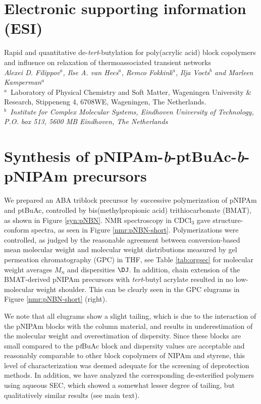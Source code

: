 \documentclass{article}
\begin{document}
\section*{Electronic supporting information (ESI)}
{\Large{Rapid and quantitative de-\emph{tert}-butylation for poly(acrylic acid) block copolymers and
influence on relaxation of thermoassociated transient networks}}\\[3\baselineskip]
{\textit{Alexei D. Filippov$^a$, Ilse A. van Hees$^a$, Remco Fokkink$^a$, Ilja Voets$^b$ and Marleen Kamperman$^a$}}\\[1\baselineskip]
{\textit{$^{a}$}~Laboratory of Physical Chemistry and Soft Matter, Wageningen University \&
Research, Stippeneng 4, 6708WE, Wageningen, The Netherlands.} \\
{\textit{$^{b}$~Institute for Complex Molecular Systems, Eindhoven University of Technology,
P.O. box 513, 5600 MB Eindhoven, The Netherlands}}

\clearpage
\section{Synthesis of pNIPAm-\emph{b}-ptBuAc-\emph{b}-pNIPAm precursors}
We prepared an ABA triblock precursor by successive polymerization of 
pNIPAm and ptBuAc, controlled by bis(methylpropionic acid) trithiocarbonate (BMAT), as shown in
Figure \ref{syn:pNBN}. NMR spectroscopy in CDCl$_\mathrm{3}$ gave structure-conform 
spectra, as seen in Figure \ref{nmr:pNBN-short}.
Polymerizations were controlled, as judged by the reasonable agreement between
conversion-based mean molecular weight and molecular weight distributions measured by 
gel permeation chromatography (GPC) in THF, see 
Table \ref{tab:orgsec} for molecular weight averages $M_n$ and dispersities $\DJ$. 
In addition, chain extension of the BMAT-derived pNIPAm precursors with 
\emph{tert}-butyl acrylate resulted in no low-molecular weight shoulder. This can be 
clearly seen in the GPC elugrams in Figure \ref{nmr:pNBN-short} (right).

We note that all elugrams show a slight tailing, which is due to the interaction of the pNIPAm blocks 
with the column material,\cite{Cetintas2017} and results in underestimation of the 
molecular weight and overestimation of dispersity. Since these blocks are small compared to the p\emph{t}BuAc 
block and dispersity values are acceptable and reasonably comparable to other block copolymers 
of NIPAm and styrene,\cite{Cetintas2017} 
this level of characterization was deemed adequate for the screening of deprotection methods.
In addition, we have analyzed the corresponding de-esterified polymers using aqueous SEC,
which showed a somewhat lesser degree of tailing, but qualitatively similar results (see 
main text).
\end{document}
